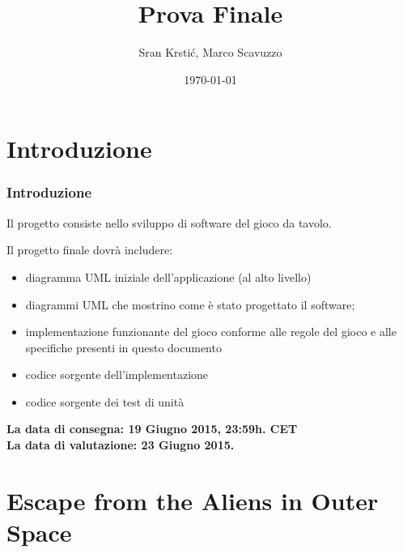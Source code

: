 \documentclass{beamer}
\title[Prova Finale]{Prova Finale} %
\author{Sr\dj{}an Krsti\'c, Marco Scavuzzo} %
\institute[] %
{
Politecnico di Milano \\ %
\medskip
\textit{srdan.krstic@polimi.it, marco.scavuzzo@polimi.it} %
}
\date{\today} %
\begin{document}
\begin{frame}
\titlepage %
\end{frame}





\section{Introduzione}
\begin{frame}
\frametitle{Introduzione}
Il progetto consiste nello sviluppo di software del gioco da tavolo.

Il progetto finale dovr\` a includere:
\begin{itemize}
\item diagramma UML iniziale dell'applicazione  (al alto livello)
\item diagrammi UML che mostrino come \`e stato progettato il software;
\item implementazione funzionante del gioco conforme alle regole del gioco e alle specifiche presenti in questo documento
\item codice sorgente dell'implementazione
\item codice sorgente dei test di unit\`a
\end{itemize}
\textbf{La data di consegna: 19 Giugno 2015, 23:59h. CET}\\
\textbf{La data di valutazione: 23 Giugno 2015.}
\end{frame}


{
%
\section{Escape from the Aliens in Outer Space}
\begin{frame}[plain]


\end{frame}
}
\end{document}
